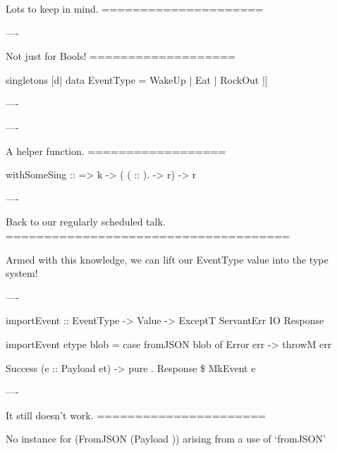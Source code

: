Lots to keep in mind.
=====================

\begin{table}
  \singhead
\end{table}

----

Not just for Bools!
===================

\begin{hs}
  singletons [d|
    data EventType = WakeUp
                   | Eat
                   | RockOut
    |]
\end{hs}

----

\begin{table}
  \singhead
\end{table}

----

A helper function.
==================

\begin{custom}
  withSomeSing ::  
               => k
               -> ( ( :: ).   -> r)
               -> r
\end{custom}

----

Back to our regularly scheduled talk.
=====================================

Armed with this knowledge, we can lift our EventType value into the type system!

----

\begin{raw}
  importEvent :: EventType
              -> Value
              -> ExceptT ServantErr IO Response

  importEvent etype blob =
      case fromJSON blob of
        Error err ->
          throwM err

        Success (e :: Payload et) ->
          pure . Response \$ MkEvent e
\end{raw}

----

It still doesn't work.
======================

\begin{error}
  No instance for (FromJSON (Payload ))
    arising from a use of `fromJSON'
\end{error}

